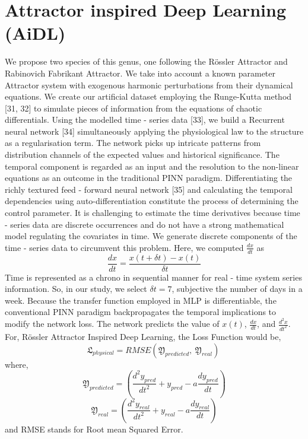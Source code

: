 \documentclass[conference]{IEEEtran}
\begin{document}
\section{Attractor inspired Deep Learning (AiDL)}\label{sec3}
We propose two species of this genus, one following the Rössler Attractor and Rabinovich Fabrikant Attractor. We take into account a known parameter Attractor system with exogenous harmonic perturbations from their dynamical equations. We create our artificial dataset  employing the Runge-Kutta method [31, 32] to simulate pieces of information from the equations of chaotic differentials. Using the modelled time - series data [33], we build a Recurrent neural network [34] simultaneously applying the physiological law to the structure as a regularisation term. The network picks up intricate patterns from distribution channels of the expected values and historical significance. The temporal component is regarded as an input and the resolution to the non-linear equations as an outcome in the traditional PINN paradigm. Differentiating the richly textured feed - forward neural network [35] and calculating the temporal dependencies using auto-differentiation constitute the process of determining the control parameter. It is challenging to estimate the time derivatives because time - series data are discrete occurrences and do not have a strong mathematical model regulating the covariates in time. We generate discrete components of the time - series data to circumvent this problem. Here, we computed $\frac{dx}{dt}$ as 
\begin{equation}\label{eq12}
\frac{dx}{dt}=\frac{x\left(t+\delta t\right)-x\left(t\right)}{\delta t}
\end{equation}
Time is represented as a chrono in sequential manner for real - time system series information. So, in our study, we select $\delta t=7$, subjective the number of days in a week. Because the transfer function employed in MLP is differentiable, the conventional PINN paradigm backpropagates the temporal implications to modify the network loss. The network predicts the value of $x(t)$, $\frac{dx}{dt}$, and $\frac{d^2x}{dt^2}$. For, Rössler Attractor Inspired Deep Learning, the Loss Function would be, 
\begin{equation}\label{eq13}
\mathfrak{L}_{physical}=RMSE\left(\mathfrak{Y}_{predicted},\ \mathfrak{Y}_{real}\right)\ 
\end{equation}
where, 
\begin{equation*}
\mathfrak{Y}_{predicted}=\left(\frac{d^2y_{pred}}{dt^2}+y_{pred}-a\frac{dy_{pred}}{dt}\right)
\end{equation*}
\begin{equation*}
\mathfrak{Y}_{real}=\left(\frac{d^2y_{real}}{dt^2}+y_{real}-a\frac{dy_{real}}{dt}\right)
\end{equation*}
and RMSE stands for Root mean Squared Error. \\
\end{document}
